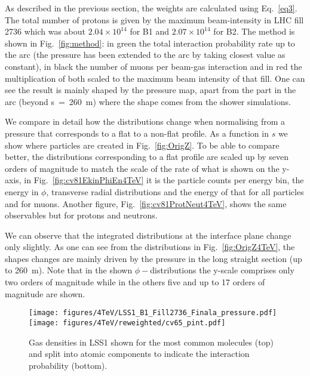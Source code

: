As described in the previous section, the weights are calculated using Eq.~\ref{eq3}. The total number of protons is given by the maximum beam-intensity in LHC fill 2736 which was about $2.04 \times 10^{14}$ for B1 and $2.07 \times 10^{14}$ for B2. The method is shown in Fig.~\ref{fig:method}: in green the total interaction probability rate up to the arc (the pressure has been extended to the arc by taking closest value as constant), in black the number of muons per beam-gas interaction and in red the multiplication of both scaled to the maximum beam intensity of that fill. One can see the result is mainly shaped by the pressure map, apart from the part in the arc (beyond s~=~260~m) where the shape comes from the shower simulations. 

We compare in detail how the distributions change when normalising from a pressure that corresponds to a flat to a non-flat profile. As a function in $s$ we show where particles are created in Fig.~\ref{fig:OrigZ}. To be able to compare better, the distributions corresponding to a flat profile are scaled up by seven orders of magnitude to match the scale of the rate of what is shown on the y-axis, in Fig.~\ref{fig:cv81EkinPhiEn4TeV} it is the particle counts per energy bin, the energy in $\phi$, transverse radial distributions and the energy of that for all particles and for muons. Another figure, Fig.~\ref{fig:cv81ProtNeut4TeV}, shows the same observables but for protons and neutrons.

We can observe that the integrated distributions at the interface plane change only slightly. As one can see from the distributions in Fig.~\ref{fig:OrigZ4TeV}, the shapes changes are mainly driven by the pressure in the long straight section (up to 260~m). Note that in the shown $\phi-$distributions the y-scale comprises only two orders of magnitude while in the others five and up to 17 orders of magnitude are shown.

\begin{figure}%
\begin{center}
  \texttt{[image: figures/4TeV/LSS1\_B1\_Fill2736\_Finala\_pressure.pdf]}
  \texttt{[image: figures/4TeV/reweighted/cv65\_pint.pdf]}
\end{center}
\vspace{-0.6cm}
 \caption{Gas densities in LSS1 shown for the most common molecules (top) and split into atomic components to indicate the interaction probability (bottom).
  \label{pressure2012}}
\end{figure}

